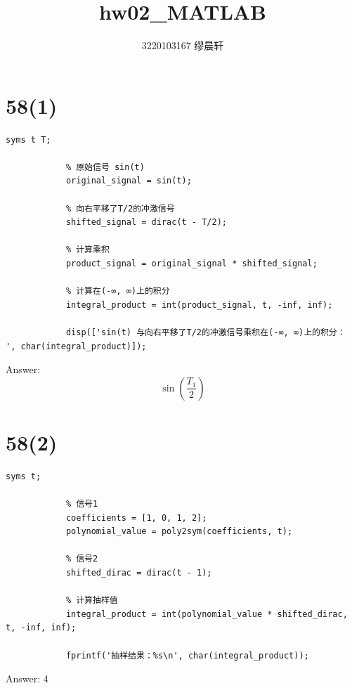 \documentclass{article}
\title{hw02\_MATLAB}
\author{3220103167 缪晨轩}
\date{\zhdate{2024/3/4}}
\begin{document}
\maketitle

    \section*{58(1)}
        \begin{lstlisting}[caption={题58(1)MATLAB代码}, label={lst:matlab}]
            syms t T;

            % 原始信号 sin(t)
            original_signal = sin(t);

            % 向右平移了T/2的冲激信号
            shifted_signal = dirac(t - T/2);

            % 计算乘积
            product_signal = original_signal * shifted_signal;

            % 计算在(-∞, ∞)上的积分
            integral_product = int(product_signal, t, -inf, inf);

            disp(['sin(t) 与向右平移了T/2的冲激信号乘积在(-∞, ∞)上的积分： ', char(integral_product)]);

        \end{lstlisting}
        Answer: \[\sin \left( {\frac{{{T_1}}}{2}} \right)\]
    \section*{58(2)}
        \begin{lstlisting}[caption={题58(2)MATLAB代码}, label={lst:matlab}]
            syms t;

            % 信号1
            coefficients = [1, 0, 1, 2];
            polynomial_value = poly2sym(coefficients, t);

            % 信号2
            shifted_dirac = dirac(t - 1);

            % 计算抽样值
            integral_product = int(polynomial_value * shifted_dirac, t, -inf, inf);

            fprintf('抽样结果：%s\n', char(integral_product));

        \end{lstlisting}
        Answer: 4
\end{document}
